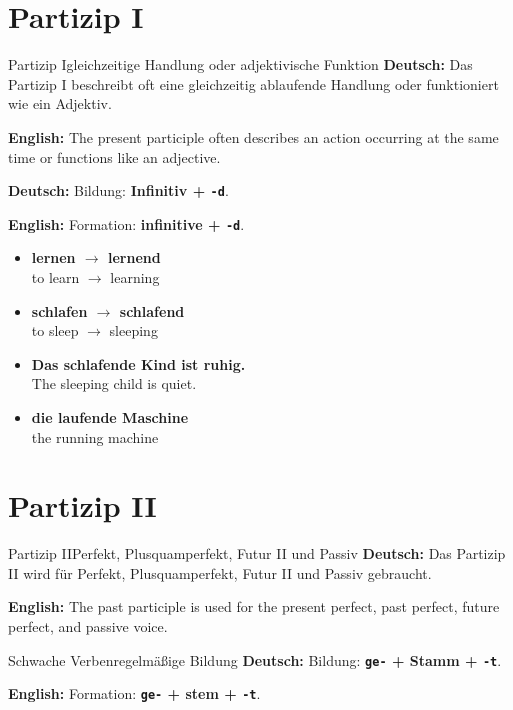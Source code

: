 \documentclass[a4paper,11pt]{article}
\newcommand{\GermanText}[1]{\textbf{Deutsch: }#1\par}
\newcommand{\EnglishText}[1]{{\small\color{SoftGray}\textbf{English: }#1\par}}
\newcommand{\ExampleItem}[2]{\item \textbf{#1}\\{\small\color{SoftGray}#2}}
\begin{document}
    \section{Partizip I}

        \begin{grammarentry}{Partizip I}{gleichzeitige Handlung oder adjektivische Funktion}
            \GermanText{Das Partizip I beschreibt oft eine gleichzeitig ablaufende Handlung oder funktioniert wie ein Adjektiv.}
            \EnglishText{The present participle often describes an action occurring at the same time or functions like an adjective.}

            \GermanText{Bildung: \textbf{Infinitiv + \texttt{-d}}.}
            \EnglishText{Formation: \textbf{infinitive + \texttt{-d}}.}
        \end{grammarentry}

        \begin{exbox}
            \begin{itemize}
                \ExampleItem{lernen $\rightarrow$ lernend}{to learn $\rightarrow$ learning}
                \ExampleItem{schlafen $\rightarrow$ schlafend}{to sleep $\rightarrow$ sleeping}
                \ExampleItem{Das schlafende Kind ist ruhig.}{The sleeping child is quiet.}
                \ExampleItem{die laufende Maschine}{the running machine}
            \end{itemize}
        \end{exbox}

    \section{Partizip II}

        \begin{grammarentry}{Partizip II}{Perfekt, Plusquamperfekt, Futur II und Passiv}
            \GermanText{Das Partizip II wird für Perfekt, Plusquamperfekt, Futur II und Passiv gebraucht.}
            \EnglishText{The past participle is used for the present perfect, past perfect, future perfect, and passive voice.}
        \end{grammarentry}

        \begin{grammarentry}{Schwache Verben}{regelmäßige Bildung}
            \GermanText{Bildung: \textbf{\texttt{ge-} + Stamm + \texttt{-t}}.}
            \EnglishText{Formation: \textbf{\texttt{ge-} + stem + \texttt{-t}}.}
        \end{grammarentry}
\end{document}

